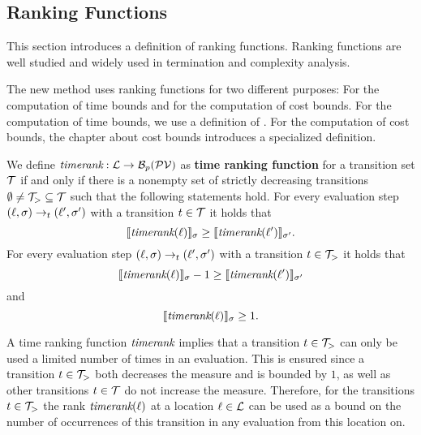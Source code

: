 \subsection{Ranking Functions}

This section introduces a definition of ranking functions.
Ranking functions are well studied \cite{bradley2005polyranking, podelski2004prf, bradley2005linear, bagnara2012new, leike2014ranking, ben2013linear} and widely used in termination and complexity analysis.

The new method uses ranking functions for two different purposes:
For the computation of time bounds and for the computation of cost bounds.
For the computation of time bounds, we use a definition of \cite{koat}.
For the computation of cost bounds, the chapter about cost bounds introduces a specialized definition.

\begin{definition} 
  We define $\emph{timerank}: \mathcal{L} \rightarrow \mathcal{B}_p(\mathcal{PV})$ as \textbf{time ranking function} for a transition set $\mathcal{T}$ if and only if there is a nonempty set of strictly decreasing transitions $\emptyset \neq \mathcal{T}_{>} \subseteq \mathcal{T}$ such that the following statements hold.
  For every evaluation step $(\ell, \sigma) \rightarrow_t (\ell', \sigma')$ with a transition $t \in \mathcal{T}$ it holds that
  \[ \llbracket \emph{timerank}(\ell) \rrbracket_{\sigma} \geq \llbracket \emph{timerank}(\ell') \rrbracket_{\sigma'}. \]
  For every evaluation step $(\ell, \sigma) \rightarrow_t (\ell', \sigma')$ with a transition $t \in \mathcal{T}_{>}$ it holds that        
  \[ \llbracket \emph{timerank}(\ell) \rrbracket_{\sigma} - 1 \geq \llbracket \emph{timerank}(\ell') \rrbracket_{\sigma'} \]
  and
  \[ \llbracket \emph{timerank}(\ell) \rrbracket_{\sigma} \geq 1. \]
\end{definition}

A time ranking function $\emph{timerank}$ implies that a transition $t \in \mathcal{T}_>$ can only be used a limited number of times in an evaluation.
This is ensured since a transition $t \in \mathcal{T}_>$ both decreases the measure and is bounded by $1$, as well as other transitions $t \in \mathcal{T}$ do not increase the measure.
Therefore, for the transitions $t \in \mathcal{T}_>$ the rank $\emph{timerank}(\ell)$ at a location $\ell \in \mathcal{L}$ can be used as a bound on the number of occurrences of this transition in any evaluation from this location on.

